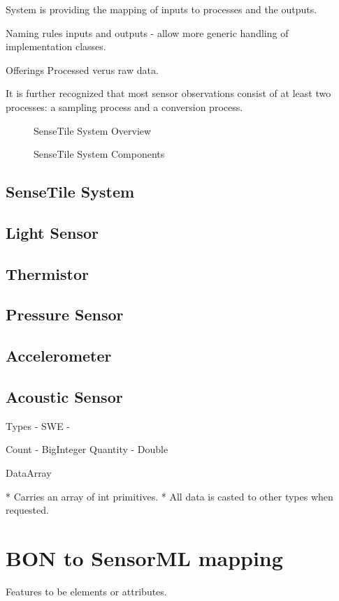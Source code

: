 \documentclass[]{final_report}
\begin{document}
System is providing the mapping of inputs to processes and the outputs.

Naming rules inputs and outputs - allow more generic handling of implementation classes.

Offerings Processed verus raw data.

It is further recognized that most sensor observations consist of at least two processes: a sampling process and a conversion process.

 \begin{figure}
\caption{SenseTile System Overview}\label{fig:SenseTileSystem.pdf}
\end{figure}

 \begin{figure}
\caption{SenseTile System Components}\label{fig:SensorML_SenseTile_System_2_pa1.pdf}
\end{figure}

\subsection{SenseTile System}
\subsection{Light Sensor}
\subsection{Thermistor}
\subsection{Pressure Sensor}
\subsection{Accelerometer}
\subsection{Acoustic Sensor}

Types
 - SWE -

Count - BigInteger
Quantity - Double

DataArray

 * Carries an array of int primitives.
 * All data is casted to other types when requested.


\newpage
\section{BON to SensorML mapping}
Features to be elements or attributes.
\end{document}

